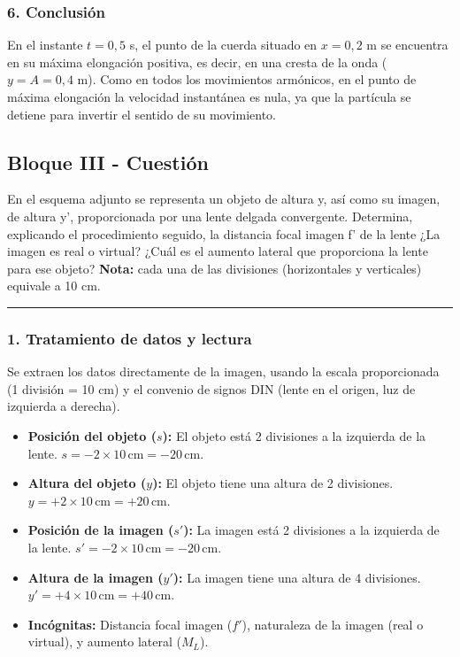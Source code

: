 \subsubsection*{6. Conclusión}
\begin{cajaconclusion}
En el instante $t=0,5$ s, el punto de la cuerda situado en $x=0,2$ m se encuentra en su máxima elongación positiva, es decir, en una cresta de la onda ($y=A=0,4$ m). Como en todos los movimientos armónicos, en el punto de máxima elongación la velocidad instantánea es nula, ya que la partícula se detiene para invertir el sentido de su movimiento.
\end{cajaconclusion}

\newpage

\subsection{Bloque III - Cuestión}
\label{subsec:A3_2013_jul_ext}

\begin{cajaenunciado}
En el esquema adjunto se representa un objeto de altura y, así como su imagen, de altura y', proporcionada por una lente delgada convergente. Determina, explicando el procedimiento seguido, la distancia focal imagen f' de la lente ¿La imagen es real o virtual? ¿Cuál es el aumento lateral que proporciona la lente para ese objeto?
\textbf{Nota:} cada una de las divisiones (horizontales y verticales) equivale a 10 cm.
\end{cajaenunciado}
\hrule

\subsubsection*{1. Tratamiento de datos y lectura}
Se extraen los datos directamente de la imagen, usando la escala proporcionada (1 división = 10 cm) y el convenio de signos DIN (lente en el origen, luz de izquierda a derecha).
\begin{itemize}
    \item \textbf{Posición del objeto ($s$):} El objeto está 2 divisiones a la izquierda de la lente. $s = -2 \times 10\,\text{cm} = -20\,\text{cm}$.
    \item \textbf{Altura del objeto ($y$):} El objeto tiene una altura de 2 divisiones. $y = +2 \times 10\,\text{cm} = +20\,\text{cm}$.
    \item \textbf{Posición de la imagen ($s'$):} La imagen está 2 divisiones a la izquierda de la lente. $s' = -2 \times 10\,\text{cm} = -20\,\text{cm}$.
    \item \textbf{Altura de la imagen ($y'$):} La imagen tiene una altura de 4 divisiones. $y' = +4 \times 10\,\text{cm} = +40\,\text{cm}$.
    \item \textbf{Incógnitas:} Distancia focal imagen ($f'$), naturaleza de la imagen (real o virtual), y aumento lateral ($M_L$).
\end{itemize}

